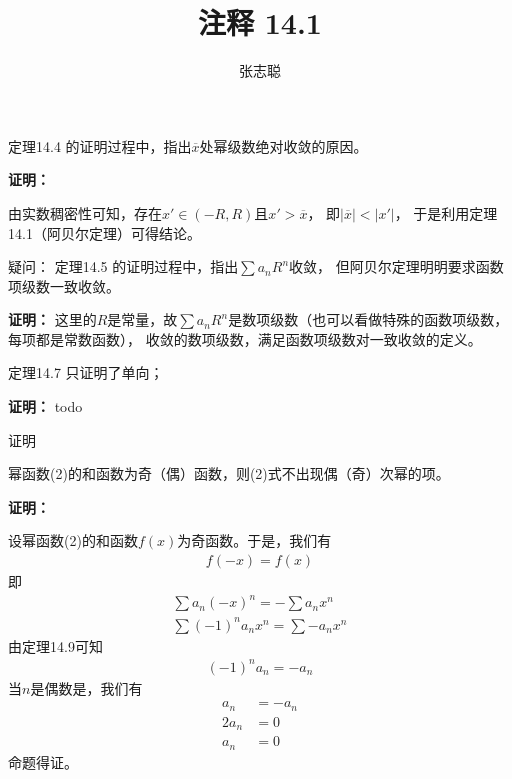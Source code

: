 \documentclass{article}
\begin{document}
\title{注释 14.1}
\author{张志聪}
\maketitle


\begin{zremark}
  定理14.4 的证明过程中，指出$\overline{x}$处幂级数绝对收敛的原因。
\end{zremark}
\textbf{证明：}

由实数稠密性可知，存在$x' \in (-R, R)$且$x' > \overline{x}$，
即$|\overline{x}| < |x'|$，
于是利用定理14.1（阿贝尔定理）可得结论。

\begin{zremark}
  疑问：
  定理14.5 的证明过程中，指出$\sum a_n R^n$收敛，
  但阿贝尔定理明明要求函数项级数一致收敛。
\end{zremark}
\textbf{证明：}
这里的$R$是常量，故$\sum a_n R^n$是数项级数（也可以看做特殊的函数项级数，每项都是常数函数），
收敛的数项级数，满足函数项级数对一致收敛的定义。

\begin{zremark}
  定理14.7 只证明了单向；
\end{zremark}
\textbf{证明：}
todo

\begin{zremark}
  证明

  幂函数(2)的和函数为奇（偶）函数，则(2)式不出现偶（奇）次幂的项。
\end{zremark}
\textbf{证明：}

设幂函数(2)的和函数$f(x)$为奇函数。于是，我们有
\begin{align*}
  f(-x) = f(x)
\end{align*}
即
\begin{align*}
  \sum a_n (-x)^n = - \sum a_n x^n \\
  \sum (-1)^n a_n x^n = \sum - a_n x^n
\end{align*}
由定理14.9可知
\begin{align*}
  (-1)^n a_n = - a_n
\end{align*}
当$n$是偶数是，我们有
\begin{align*}
  a_n   & = - a_n \\
  2 a_n & = 0     \\
  a_n   & = 0
\end{align*}
命题得证。
\end{document}
